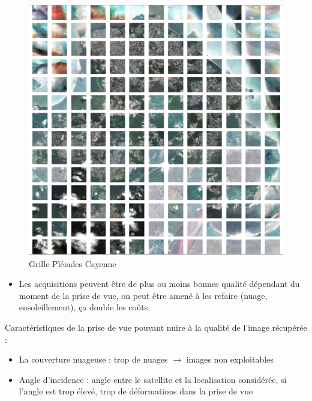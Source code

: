 \documentclass[
  letterpaper,
  DIV=11,
  numbers=noendperiod]{scrreprt}
\providecommand{\tightlist}{%
  \setlength{\itemsep}{0pt}\setlength{\parskip}{0pt}}\usepackage{longtable,booktabs,array}
\begin{document}
\begin{figure}[H]

{\centering \includegraphics{figures/Grille_images.png}

}

\caption{\label{fig-pleiade-grid}Grille Pléiades Cayenne}

\end{figure}

\begin{itemize}
\tightlist
\item
  Les acquisitions peuvent être de plus ou moins bonnes qualité
  dépendant du moment de la prise de vue, on peut être amené à les
  refaire (nuage, ensoleillement), ça double les coûts.
\end{itemize}

Caractéristiques de la prise de vue pouvant nuire à la qualité de
l'image récupérée :

\begin{itemize}
\tightlist
\item
  La couverture nuageuse : trop de nuages \(\longrightarrow\) images non
  exploitables
\item
  Angle d'incidence : angle entre le satellite et la localisation
  considérée, si l'angle est trop élevé, trop de déformations dans la
  prise de vue
\end{itemize}
\end{document}
